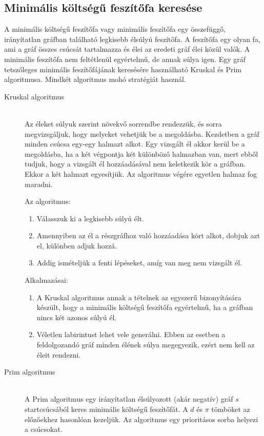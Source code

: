 \documentclass[margin=0px]{article}
\begin{document}
\subsection{Minimális költségű feszítőfa keresése}
A minimális költségű feszítőfa vagy minimális feszítőfa egy összefüggő, irányítatlan gráfban található legkisebb élsúlyú feszítőfa. A feszítőfa egy olyan fa, ami a gráf összes csúcsát tartalmazza és élei az eredeti gráf élei közül valók. A minimális feszítőfa nem feltétlenül egyértelmű, de annak súlya igen. Egy gráf tetszőleges minimális feszítőfájának keresésére használható Kruskal és Prim algoritmusa. Mindkét algoritmus mohó stratégiát használ.
\begin{description}
	\item[Kruskal algoritmus] \hfill \\
	   Az éleket súlyuk szerint növekvő sorrendbe rendezzük, és sorra megvizsgáljuk, hogy melyeket vehetjük be a megoldásba. Kezdetben a gráf minden csúcsa egy-egy halmazt alkot. Egy vizsgált él akkor kerül be a megoldásba, ha a két végpontja két különböző halmazban van, mert ebből tudjuk, hogy a vizsgált él hozzáadásával nem keletkezik kör a gráfban. Ekkor a két halmazt egyesítjük. Az algoritmus végére egyetlen halmaz fog maradni.

	  Az algoritmus:
	  \begin{enumerate}
		 \item Válasszuk ki a legkisebb súlyú élt.
		 \item Amennyiben az él a részgráfhoz való hozzáadása kört alkot, dobjuk azt el, különben adjuk hozzá.
		 \item Addig ismételjük a fenti lépéseket, amíg van meg nem vizsgált él.
	  \end{enumerate}
	  Alkalmazásai:
	  \begin{enumerate}
	  	 \item A Kruskal algoritmus annak a tételnek az egyszerű bizonyítására készült, hogy a minimális költségű feszítőfa egyértelmű, ha a gráfban nincs két azonos súlyú él.
	  	 \item Véletlen labirintust lehet vele generálni. Ebben az esetben a feldolgozandó gráf minden élének súlya megegyezik, ezért nem kell az éleit rendezni.
	  \end{enumerate}
	\item[Prim algoritmus] \hfill \\
	A Prim algoritmus egy irányítatlan élsúlyozott (akár negatív) gráf $s$ startcsúcsából keres minimális költségű feszítőfát. A $d$ és $\pi$ tömböket az előzőekhez hasonlóan kezeljük. Az algoritmus egy prioritásos sorba helyezi a csúcsokat.


\end{description}
\end{document}

